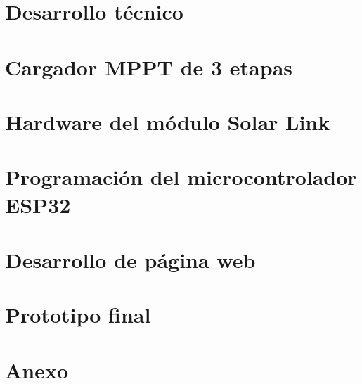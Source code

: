 \documentclass{ol-softwaremanual}
\begin{document}


\clearpage

\section{Desarrollo técnico}



\clearpage

\section{Cargador MPPT de 3 etapas}



\clearpage

\section{Hardware del módulo Solar Link}



\clearpage

\section{Programación del microcontrolador ESP32}



\clearpage

\section{Desarrollo de página web}



\clearpage

\section{Prototipo final}



\clearpage

\section{Anexo}



\clearpage
\end{document}
